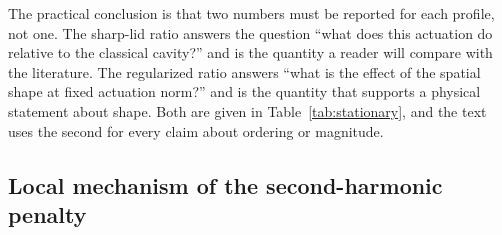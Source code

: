 \documentclass[11pt,a4paper]{article}
\begin{document}
The practical conclusion is that two numbers must be reported for each profile,
not one. The sharp-lid ratio answers the question ``what does this actuation do
relative to the classical cavity?'' and is the quantity a reader will compare with
the literature. The regularized ratio answers ``what is the effect of the spatial
shape at fixed actuation norm?'' and is the quantity that supports a physical
statement about shape. Both are given in Table~\ref{tab:stationary}, and the text
uses the second for every claim about ordering or magnitude.

\subsection{Local mechanism of the second-harmonic penalty}
\label{sec:mechanism}
\end{document}
